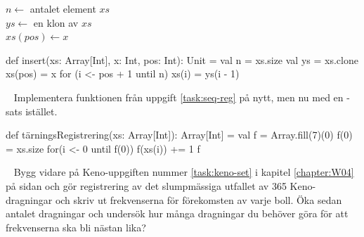 {\SubtaskSolved

\begin{algorithm}[H]

 $n \leftarrow$ antalet element $xs$\\
 $ys \leftarrow$ en klon av $xs$\\
 $xs(pos) \leftarrow x$\\
\end{algorithm}

\SubtaskSolved  \begin{Code}
def insert(xs: Array[Int], x: Int, pos: Int): Unit = {
  val n = xs.size
  val ys = xs.clone
  xs(pos) = x
  for (i <- pos + 1 until n) xs(i) = ys(i - 1)
}
\end{Code}



\QUESTEND









\QUESTBEGIN

\Task  \what~ Implementera funktionen  från uppgift \ref{task:seq-reg} på nytt, men nu med en -sats istället.


\SOLUTION


\TaskSolved \what


\begin{Code}
def tärningsRegistrering(xs: Array[Int]): Array[Int] = {
  val f = Array.fill(7)(0)
  f(0) = xs.size
  for(i <- 0 until f(0)) f(xs(i)) += 1
  f
}
\end{Code}



\QUESTEND









\QUESTBEGIN

\Task  \what~ Bygg vidare på Keno-uppgiften nummer \ref{task:keno-set} i kapitel \ref{chapter:W04} på sidan \pageref{task:keno-set} och gör registrering av det slumpmässiga utfallet av 365 Keno-dragningar och skriv ut frekvenserna för förekomsten av varje boll. Öka sedan antalet dragningar och undersök hur många dragningar du behöver göra för att frekvenserna ska bli nästan lika?


}
